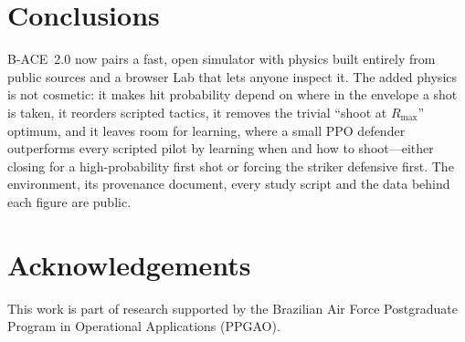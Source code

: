 \documentclass[11pt,a4paper]{article}
\begin{document}
\section{Conclusions}

B-ACE~2.0 now pairs a fast, open simulator with physics built entirely from public sources and a browser Lab that lets anyone inspect it.
The added physics is not cosmetic: it makes hit probability depend on where in the envelope a shot is taken, it reorders scripted tactics, it removes the trivial ``shoot at $R_{\max}$'' optimum, and it leaves room for learning, where a small PPO defender outperforms every scripted pilot by learning when and how to shoot---either closing for a high-probability first shot or forcing the striker defensive first.
The environment, its provenance document, every study script and the data behind each figure are public.

\section*{Acknowledgements}

This work is part of research supported by the Brazilian Air Force Postgraduate Program in Operational Applications (PPGAO).



\end{document}
